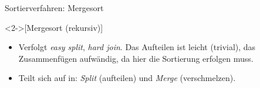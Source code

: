 \begin{frame}{Sortierverfahren: Mergesort}
    \begin{definition}<2->[Mergesort \hfill{}(rekursiv)]
    \end{definition}
    \begin{itemize}[<+(1)->]
        \item Verfolgt \emph{easy split}, \emph{hard join}. Das Aufteilen ist leicht (trivial), das Zusammenfügen aufwändig, da hier die Sortierung erfolgen muss.
        \item Teilt sich auf in: \emph{Split} (aufteilen) und \emph{Merge} (verschmelzen).
    \end{itemize}
    \vfill
    \begin{center}\pause
         \qquad~~\qquad%
    \end{center}
\end{frame}


